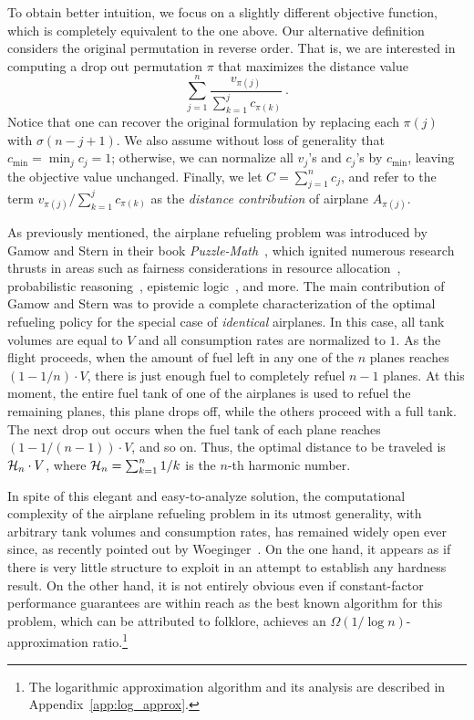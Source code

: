 \documentclass[11pt]{article}
\theoremstyle{plain}
\theoremstyle{definition}
\begin{document}
To obtain better intuition, we focus on a slightly different objective function, which is completely equivalent to the one above. Our alternative definition considers the original permutation in reverse order. That is, we are interested in computing a drop out permutation $\pi$ that maximizes the distance value
$$
\sum_{j = 1}^n \frac{v_{\pi(j)}}{\sum_{k = 1}^j c_{ \pi(k) }}  \ . 
$$
Notice that one can recover the original formulation by replacing each $\pi(j)$ with $\sigma(n-j+1)$. We also assume without loss of generality that $c_{\min} = \min_j c_j = 1$; otherwise, we can normalize all $v_j$'s and $c_j$'s by $c_{\min}$, leaving the objective value unchanged. Finally, we let $C = \sum_{j=1}^n c_{j}$, and refer to the term $v_{\pi(j)} / \sum_{k = 1}^j c_{ \pi(k) }$ as the \textit{distance contribution} of airplane $A_{\pi(j) }$.

\smallskip {} As previously mentioned, the airplane refueling problem was introduced by Gamow and Stern in their book \textit{Puzzle-Math}~\cite{GamowS58}, which ignited numerous research thrusts in areas such as fairness considerations in resource allocation~\cite{Thomson11, Procaccia13}, probabilistic reasoning~\cite{Knuth69, Wuffle82, DeS96}, epistemic logic~\cite{BaltagDM08, DitmarschRV08}, and more. The main contribution of Gamow and Stern was to  provide a complete characterization of the optimal refueling policy for the special case of \textit{identical} airplanes. In this case, all tank volumes are equal to $V$ and all consumption rates are normalized to $1$. As the flight proceeds, when the amount of fuel left in any one of the $n$ planes reaches $(1 - 1/n) \cdot V$, there is just enough fuel to completely refuel $n-1$ planes. At this moment, the entire fuel tank of one of the airplanes is used to refuel the remaining planes, this plane drops off, while the others proceed with a full tank. The next drop out occurs when the fuel tank of each plane reaches $(1 - 1 / (n-1)) \cdot V$, and so on. Thus, the optimal distance to be traveled is ${\cal H}_n \cdot V$, where ${\cal H}_n = \sum_{k = 1}^n 1 / k$ is the $n$-th harmonic number.

In spite of this elegant and easy-to-analyze solution, the computational complexity of the airplane refueling problem in its utmost generality, with arbitrary tank volumes and consumption rates, has remained widely open ever since, as recently pointed out by Woeginger~\cite{Dagstuhl2010}. On the one hand, it appears as if there is very little structure to exploit in an attempt to establish any hardness result. On the other hand, it is not entirely obvious even if constant-factor performance guarantees are within reach as the best known algorithm for this problem, which can be attributed to folklore, achieves an $\Omega(1 / \log n)$-approximation ratio.\footnote{The logarithmic approximation algorithm and its analysis are described in Appendix~\ref{app:log_approx}.}
\end{document}
